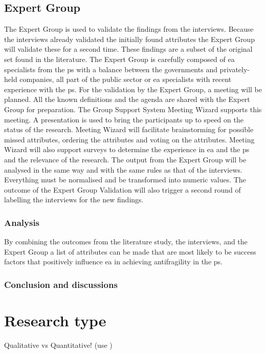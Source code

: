 \subsection{Expert Group}
\label{sub:expertgroup}
The Expert Group is used to validate the findings from the interviews. Because the interviews already validated the initially found attributes the Expert Group will validate these for a second time. These findings are a subset of the original set found in the literature. The Expert Group is carefully composed of \acrshort{ea} specialists from the \gls{ps} with a balance between the governments and privately-held companies, all part of the public sector or \acrshort{ea} specialists with recent experience with the \gls{ps}. For the validation by the Expert Group, a meeting will be planned. All the known definitions and the agenda are shared with the Expert Group for preparation. The Group Support System Meeting Wizard supports this meeting. A presentation is used to bring the participants up to speed on the status of the research. Meeting Wizard will facilitate brainstorming for possible missed attributes, ordering the attributes and voting on the attributes. Meeting Wizard will also support surveys to determine the experience in \acrshort{ea} and the \gls{ps} and the relevance of the research. The output from the Expert Group will be analysed in the same way and with the same rules as that of the interviews. Everything must be normalised and be transformed into numeric values. The outcome of the Expert Group Validation will also trigger a second round of labelling the interviews for the new findings. 

\subsubsection{Analysis}
\label{subsub:analysis}
By combining the outcomes from the literature study, the interviews, and the Expert Group a list of attributes can be made that are most likely to be success factors that positively influence \acrshort{ea} in achieving \gls{antifragility} in the \gls{ps}.

\subsubsection{Conclusion and discussions}
\label{subsub:conclusionanddiscussions}

\section{Research type}
\label{sec:researchtype}
\begin{remark}
	Qualitative vs Quantitative! (use \parencite{Recker2013})
\end{remark}

